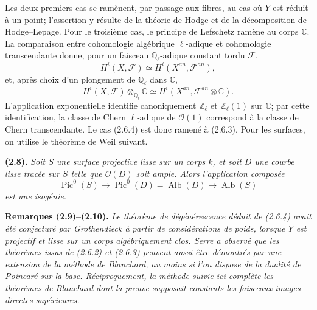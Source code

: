 \documentclass[11pt]{article}
\DeclareMathOperator{\Pic}{Pic}
\DeclareMathOperator{\Alb}{Alb}
\newcommand{\cF}{\mathcal F}
\newcommand{\cO}{\mathcal O}
\newcommand{\C}{\mathbb C}
\newcommand{\Ql}{\mathbb Q_\ell}
\newcommand{\Zl}{\mathbb Z_\ell}
\newenvironment{named}[1]{\par\medskip\noindent\textbf{#1}\itshape}{\par\medskip}
\begin{document}
Les deux premiers cas se ramènent, par passage aux fibres, au cas où $Y$ est réduit à un point; l'assertion y résulte de la théorie de Hodge et de la décomposition de Hodge--Lepage. Pour le troisième cas, le principe de Lefschetz ramène au corps $\C$. La comparaison entre cohomologie algébrique $\ell$-adique et cohomologie transcendante donne, pour un faisceau $\Ql$-adique constant tordu $\cF$,
\begin{equation}\tag{2.7.2}
H^i(X,\cF)\simeq H^i(X^{an},\cF^{an}),
\end{equation}
et, après choix d'un plongement de $\Ql$ dans $\C$,
\begin{equation}\tag{2.7.3}
H^i(X,\cF)\otimes_{\Ql}\C\simeq H^i(X^{an},\cF^{an}\otimes\C).
\end{equation}
L'application exponentielle identifie canoniquement $\Zl$ et $\Zl(1)$ sur $\C$; par cette identification, la classe de Chern $\ell$-adique de $\cO(1)$ correspond à la classe de Chern transcendante. Le cas (2.6.4) est donc ramené à (2.6.3). Pour les surfaces, on utilise le théorème de Weil suivant.

\begin{named}{(2.8).}
Soit $S$ une surface projective lisse sur un corps $k$, et soit $D$ une courbe lisse tracée sur $S$ telle que $\cO(D)$ soit ample. Alors l'application composée
\[
\Pic^0(S)\longrightarrow \Pic^0(D)=\Alb(D)\longrightarrow \Alb(S)
\]
est une isogénie.
\end{named}

\begin{named}{Remarques (2.9)--(2.10).}
Le théorème de dégénérescence déduit de (2.6.4) avait été conjecturé par Grothendieck à partir de considérations de poids, lorsque $Y$ est projectif et lisse sur un corps algébriquement clos. Serre a observé que les théorèmes issus de (2.6.2) et (2.6.3) peuvent aussi être démontrés par une extension de la méthode de Blanchard, au moins si l'on dispose de la dualité de Poincaré sur la base. Réciproquement, la méthode suivie ici complète les théorèmes de Blanchard dont la preuve supposait constants les faisceaux images directes supérieures.
\end{named}
\end{document}
